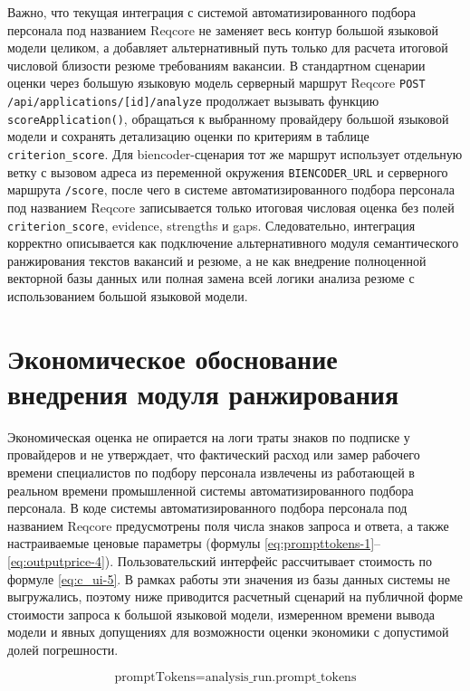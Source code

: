 Важно, что текущая интеграция с системой автоматизированного подбора персонала под названием Reqcore не заменяет весь контур большой языковой модели целиком, а добавляет альтернативный путь только для расчета итоговой числовой близости резюме требованиям вакансии. В стандартном сценарии оценки через большую языковую модель серверный маршрут Reqcore \texttt{POST {\slash}api{\slash}applications{\slash}{[}id{]}{\slash}analyze} продолжает вызывать функцию \texttt{scoreApplication()}, обращаться к выбранному провайдеру большой языковой модели и сохранять детализацию оценки по критериям в таблице \texttt{criterion\_score}. Для biencoder-сценария тот же маршрут использует отдельную ветку с вызовом адреса из переменной окружения \texttt{BIENCODER\_URL} и серверного маршрута \texttt{{\slash}score}, после чего в системе автоматизированного подбора персонала под названием Reqcore записывается только итоговая числовая оценка без полей \texttt{criterion\_score}, evidence, strengths и gaps. Следовательно, интеграция корректно описывается как подключение альтернативного модуля семантического ранжирования текстов вакансий и резюме, а не как внедрение полноценной векторной базы данных или полная замена всей логики анализа резюме с использованием большой языковой модели.

\section{Экономическое обоснование внедрения модуля ранжирования}

Экономическая оценка не опирается на логи траты знаков по подписке у провайдеров и не утверждает, что фактический расход или замер рабочего времени специалистов по подбору персонала извлечены из работающей в реальном времени промышленной системы автоматизированного подбора персонала. В коде системы автоматизированного подбора персонала под названием Reqcore предусмотрены поля числа знаков запроса и ответа, а также настраиваемые ценовые параметры (формулы \eqref{eq:prompttokens-1}--\eqref{eq:outputprice-4}). Пользовательский интерфейс рассчитывает стоимость по формуле \eqref{eq:c_ui-5}. В рамках работы эти значения из базы данных системы не выгружались, поэтому ниже приводится расчетный сценарий на публичной форме стоимости запроса к большой языковой модели, измеренном времени вывода модели и явных допущениях для возможности оценки экономики с допустимой долей погрешности.

\begin{equation}
\label{eq:prompttokens-1}
\text{promptTokens} = \text{analysis\_run.prompt\_tokens}
\end{equation}

